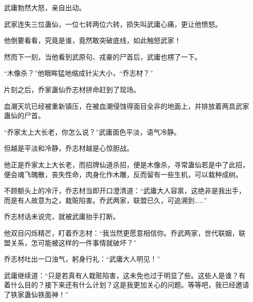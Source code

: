 \begin{this_body}
武庸勃然大怒，亲自出动。

武家连失三位蛊仙，一位七转两位六转，损失叫武庸心痛，更让他愤怒。

他倒要看看，究竟是谁，竟然敢突破底线，如此触怒武家！

然而下一刻，当他看到武原句、戎豪的尸首后，武庸也楞了一下。

“木像杀？”他眼眸猛地缩成针尖大小，“乔志材？”

片刻之后，乔家蛊仙乔志材拼命赶到了现场。

血潮天坑已经被重新镇压，在被血潮侵蚀得面目全非的地面上，并排放着两具武家蛊仙的尸首。

“乔家太上大长老，你怎么说？”武庸面色平淡，语气冷静。

但越是平淡和冷静，乔志材越是心惊胆战。

他正是乔家太上大长老，而招牌仙道杀招，便是木像杀，寻常蛊仙若是中了此招，便会魂飞魄散，丧失性命，肉身化作木雕，反而留有一些生机，可以栽种成树。

不顾额头上的冷汗，乔志材当即开口澄清道：“武庸大人容禀，这绝非是我出手，而是有人故意为之，栽赃陷害。乔武两家，联盟已久，可追溯到……”

乔志材话未说完，就被武庸抬手打断。

他双目闪烁精芒，盯着乔志材：“我当然更愿意相信你。乔武两家，世代联姻，联盟关系，怎可能被这样的一件事情就破坏？”

乔志材吐出一口浊气，躬身行礼：“武庸大人明见！”

武庸继续道：“只是若真有人栽赃陷害，这未免也过于明显了些。这些人是谁？有着什么目的？接下来还有什么计划？这是我更加关心的问题。等等吧，我已经邀请了铁家蛊仙铁面神！”

\end{this_body}

